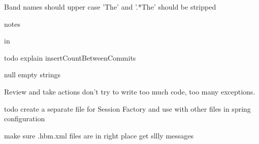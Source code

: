 \documentclass[a4paper,10pt]{book}
\begin{document}
Band names should upper case 
'The' and '.*The' should be stripped


notes 

in

todo explain insertCountBetweenCommits

null empty strings

Review and take actions  don't try to write too much code, too many exceptions.

todo create a separate file for Session Factory and use with other files in spring configuration

make sure .hbm.xml files are in right place get sllly messages
\end{document}
